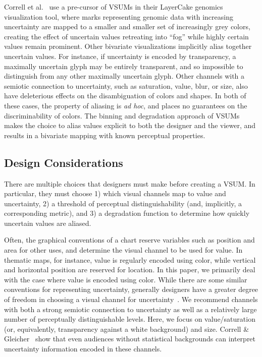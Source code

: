 \documentclass{vgtc}                          %
\begin{document}
Correll et al.~\cite{correll2015layercake,correll2011visualizing} use a pre-cursor of VSUMs in their LayerCake genomics visualization tool, where marks representing genomic data with increasing uncertainty are mapped to a smaller and smaller set of increasingly grey colors, creating the effect of uncertain values retreating into ``fog'' while highly certain values remain prominent. Other bivariate visualizations implicitly alias together uncertain values. For instance, if uncertainty is encoded by transparency, a maximally uncertain glyph may be entirely transparent, and so impossible to distinguish from any other maximally uncertain glyph. Other channels with a semiotic connection to uncertainty, such as saturation, value, blur, or size, also have deleterious effects on the disambiguation of colors and shapes. In both of these cases, the property of aliasing is \emph{ad hoc}, and places no guarantees on the discriminability of colors. The binning and degradation approach of VSUMs makes the choice to alias values explicit to both the designer and the viewer, and results in a bivariate mapping with known perceptual properties.

\subsection{Design Considerations}

\performanceFig

There are multiple choices that designers must make before creating a VSUM. In particular, they must choose 1) which visual channels map to value and uncertainty, 2) a threshold of perceptual distinguishability (and, implicitly, a corresponding metric), and 3) a degradation function to determine how quickly uncertain values are aliased.

Often, the graphical conventions of a chart reserve variables such as position and area for other uses, and determine the visual channel to be used for value. In thematic maps, for instance, value is regularly encoded using color, while vertical and horizontal position are reserved for location. In this paper, we primarily deal with the case where value is encoded using color. While there are some similar conventions for representing uncertainty, generally designers have a greater degree of freedom in choosing a visual channel for uncertainty~\cite{maceachren1992visualizing}. We recommend channels with both a strong semiotic connection to uncertainty as well as a relatively large number of perceptually distinguishable levels. Here, we focus on value/saturation (or, equivalently, transparency against a white background) and size. Correll \& Gleicher~\cite{correll2013error} show that even audiences without statistical backgrounds can interpret uncertainty information encoded in these channels.
\end{document}
